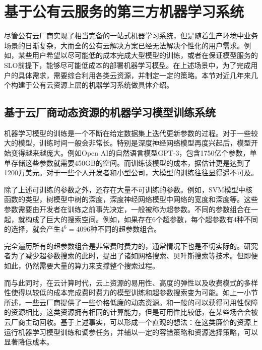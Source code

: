 \section{基于公有云服务的第三方机器学习系统}
尽管公有云厂商实现了相当完备的一站式机器学习系统，但是随着生产环境中业务场景的日渐复杂，大而全的公有云解决方案已经无法解决个性化的用户需求。例如，某些用户希望以尽可能低的成本完成大型模型的训练，或者在保证模型服务的SLO前提下，能够尽可能低成本的部署机器学习模型。在上述场景中，为了完成用户的具体需求，需要综合利用各类云资源，并制定一定的策略。本节对近几年来几个构建于公有云资源上层的机器学习系统做具体介绍。
\subsection{基于云厂商动态资源的机器学习模型训练系统}
机器学习模型的训练是一个不断在给定数据集上迭代更新参数的过程。对于一些较大的模型，训练时间一般会非常长。特别是深度神经网络模型再度兴起后，模型开始变得越来越庞大。例如Open AI的自然语言模型GPT-3，包含1750亿个参数，单单存储这些参数就需要450GB的空间。而训练该模型的成本，据估计更是达到了1200万美元。对于一些个人开发者和小型公司，大模型的训练往往显得遥不可及。

除了上述可训练的参数之外，还存在大量不可训练的参数。例如，SVM模型中核函数的类型，树模型中树的深度，深度神经网络模型中网络的宽度和深度等。这些参数需要由开发者在训练之前事先决定，一般被称为超参数。不同的参数组合在一起，就构成了巨大的搜索空间。例如，如果存在6个超参数，每个超参数有4种不同的选择，就会产生$4^6=4096$种不同的超参数组合。

完全遍历所有的超参数组合是非常费时费力的，通常情况下也是不切实际的。研究者为了减少超参数搜索的此时，提出了诸如网格搜索、贝叶斯搜索等技术。但即便如此，仍然需要大量的算力来支撑整个搜索过程。

而与此同时，在云计算时代，云上资源的易用性、高度的弹性以及收费模式的多样性使得以较低的成本完成费时费力的模型训练和超参数搜索变为可能。如上一小节所述，一些云厂商提供了一些价格低廉的动态资源。和一般的可以获得可用性保障的资源相比，这类资源拥有相同的计算能力，但是可用性比较低，在某些场合会被云厂商主动回收。基于上述事实，可以形成一个直观的想法：在这类廉价的资源上运行机器学习模型训练和调参任务，并辅以一定的容错策略和资源选择策略，可以显著降低成本。

